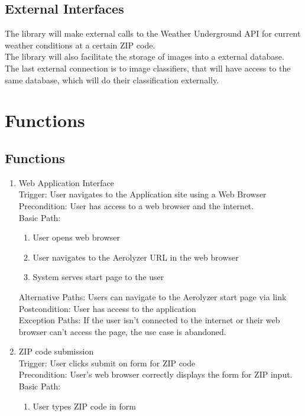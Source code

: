\documentclass[journal,10pt,draftclsnofoot,onecolumn]{IEEEtran}
\begin{document}
\begin{singlespace}
\subsection{External Interfaces}
The library will make external calls to the Weather Underground API for current weather conditions at a certain ZIP code.\\
The library will also facilitate the storage of images into a external database.\\
The last external connection is to image classifiers, that will have access to the same database, which will do their classification externally.

\section{Functions}
\subsection{Functions}
\begin{enumerate}
\item Web Application Interface\\
Trigger: User navigates to the Application site using a Web Browser\\
Precondition: User has access to a web browser and the internet.\\
Basic Path:\begin{enumerate}
\item User opens web browser
\item User navigates to the Aerolyzer URL in the web browser
\item System serves start page to the user
\end{enumerate}
Alternative Paths: Users can navigate to the Aerolyzer start page via link\\
Postcondition: User has access to the application\\
Exception Paths: If the user isn't connected to the internet or their web browser can't access the page, the use case is abandoned.
\\
\item ZIP code submission\\
Trigger: User clicks submit on form for ZIP code\\
Precondition: User's web browser correctly displays the form for ZIP input.\\
Basic Path:\begin{enumerate}
\item User types ZIP code in form

\end{enumerate}
\end{enumerate}
\end{singlespace}
\end{document}
